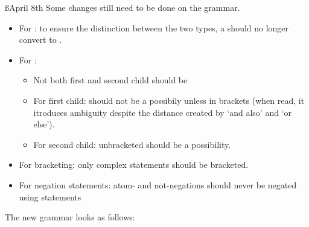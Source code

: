 \documentclass[a4paper]{article}
\begin{document}
\ss{April 8th}
Some changes still need to be done on the grammar.
\begin{itemize}
    \item For : to ensure the distinction between the two
    types, a  should no longer convert to .

    \item For :
        \begin{itemize}
            \item Not both first and second child should be 
            \item For first child:  should not be a possibily unless
            in brackets (when read, it itroduces ambiguity despite the
            distance created by `and also' and `or else').

            \item For second child: unbracketed  should be a
            possibility.
        \end{itemize}

    \item For bracketing: only complex statements should be bracketed.

    \item For negation statements: atom- and not-negations should never be
    negated using statements

\end{itemize}

The new grammar looks as follows:
\end{document}
